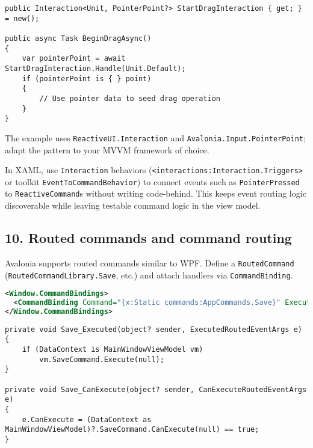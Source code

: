 \begin{lstlisting}
public Interaction<Unit, PointerPoint?> StartDragInteraction { get; } = new();

public async Task BeginDragAsync()
{
    var pointerPoint = await StartDragInteraction.Handle(Unit.Default);
    if (pointerPoint is { } point)
    {
        // Use pointer data to seed drag operation
    }
}
\end{lstlisting}

The example uses \passthrough{\lstinline!ReactiveUI.Interaction!} and
\passthrough{\lstinline!Avalonia.Input.PointerPoint!}; adapt the pattern
to your MVVM framework of choice.

In XAML, use \passthrough{\lstinline!Interaction!} behaviors
(\passthrough{\lstinline!<interactions:Interaction.Triggers>!} or
toolkit \passthrough{\lstinline!EventToCommandBehavior!}) to connect
events such as \passthrough{\lstinline!PointerPressed!} to
\passthrough{\lstinline!ReactiveCommand!}s without writing code-behind.
This keeps event routing logic discoverable while leaving testable
command logic in the view model.

\subsection{10. Routed commands and command
routing}\label{routed-commands-and-command-routing}

Avalonia supports routed commands similar to WPF. Define a
\passthrough{\lstinline!RoutedCommand!}
(\passthrough{\lstinline!RoutedCommandLibrary.Save!}, etc.) and attach
handlers via \passthrough{\lstinline!CommandBinding!}.

\begin{lstlisting}[language=XML]
<Window.CommandBindings>
  <CommandBinding Command="{x:Static commands:AppCommands.Save}" Executed="Save_Executed" CanExecute="Save_CanExecute"/>
</Window.CommandBindings>
\end{lstlisting}

\begin{lstlisting}
private void Save_Executed(object? sender, ExecutedRoutedEventArgs e)
{
    if (DataContext is MainWindowViewModel vm)
        vm.SaveCommand.Execute(null);
}

private void Save_CanExecute(object? sender, CanExecuteRoutedEventArgs e)
{
    e.CanExecute = (DataContext as MainWindowViewModel)?.SaveCommand.CanExecute(null) == true;
}
\end{lstlisting}

